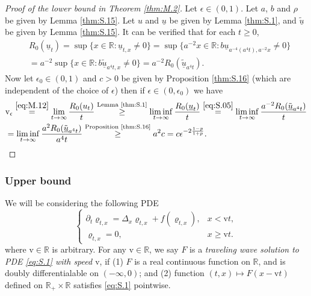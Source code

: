 \documentclass[12pt,a4paper]{amsart}
\numberwithin{equation}{section}
\theoremstyle{plain}
\theoremstyle{remark}
\begin{document}
\begin{proof}[Proof of the lower bound in Theorem \ref{thm:M.2}]
	Let $\epsilon\in (0,1)$. 
	Let $a$, $b$ and $\rho$ be given by Lemma \ref{thm:S.15}.
	Let $u$ and $\underline u$ be given by Lemma \ref{thm:S.1},
	and $\tilde {\underline{u}}$ be given by Lemma \ref{thm:S.15}.
	It can be verified that for each $t\geq 0$,
\begin{align} 
& R_0(\underline u_t) 
= \sup\{x\in \mathbb R: \underline u_{t,x} \neq 0\}
= \sup\{a^{-2}x\in \mathbb R: b\underline u_{a^{-4}(a^4t),a^{-2}x} \neq 0\}
\\&\label{eq:S.05}= a^{-2} \sup\{x\in \mathbb R: b\tilde{\underline u}_{a^4t,x} \neq 0\}
= a^{-2}R_0(\tilde {\underline u}_{a^4t}).
\end{align}
	Now let $\epsilon_0\in (0,1)$ and $c > 0$ be given by Proposition \ref{thm:S.16} (which are independent of the choice of $\epsilon$) then if $\epsilon \in (0,\epsilon_0)$ we have
\begin{align} 
& \mathrm v_\epsilon 
\overset{\eqref{eq:M.12}}= \lim_{t\to \infty} \frac{R_0(u_t)}{t} 
\overset{\text{Lemma \ref{thm:S.1}}}\geq \liminf_{t\to \infty} \frac{R_0(\underline u_t)}{t}
\overset{\eqref{eq:S.05}}= \liminf_{t\to \infty} \frac{a^{-2}R_0(\tilde {\underline u}_{a^4 t})}{t}
\\&= \liminf_{t\to \infty} \frac{a^{2}R_0(\tilde {\underline u}_{a^4 t})}{a^4t}
\overset{\text{Proposition \ref{thm:S.16}}}\geq a^{2} c = c\epsilon^{- 2\frac{1-p}{1+p}}.
\qedhere
\end{align}
\end{proof}
 
\subsubsection{Upper bound}
    We will be considering the following PDE
\begin{equation} \label{eq:S.1}
\begin{cases}
	\partial_t \varrho_{t,x} 
	= \Delta_x \varrho_{t,x} + f(\varrho_{t,x}),
	& x<\mathrm vt, \\
	\varrho_{t,x} = 0,
	& x\geq \mathrm vt.
\end{cases}
\end{equation}
    where $\mathrm v \in \mathbb R$ is arbitrary.
    For any $\mathrm v\in \mathbb R$, we say $F$ is a \emph{traveling wave solution to PDE \eqref{eq:S.1} with speed $\mathrm v$}, if (1) $F$ is a real continuous function on $\mathbb R$, and is doubly differentialable on $(-\infty, 0)$; and 
    (2) function $(t,x) \mapsto F(x - \mathrm vt)$ defined on $\mathbb R_+ \times \mathbb R$ satisfies \eqref{eq:S.1} pointwise.
    
\end{document}
